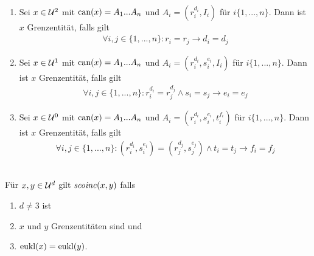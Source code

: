 \begin{dfn}[Grenzentität]\
    \begin{enumerate}
        \item Sei $x \in \mathcal{U}^2$ mit $\text{can}(x) = A_1 ... A_n$ und $A_i = (r_i^{d_i},I_i)$ für $i \{1, ..., n\}$. Dann ist $x$ Grenzentität, falls gilt
            \begin{align*}
                \forall i,j \in \{1, ..., n\}: r_i = r_j \to d_i = d_j
            \end{align*}
        \item Sei $x \in \mathcal{U}^1$ mit $\text{can}(x) = A_1 ... A_n$ und $A_i = (r_i^{d_i},s_i^{e_i},I_i)$ für $i \{1, ..., n\}$. Dann ist $x$ Grenzentität, falls gilt
            \begin{align*}
                \forall i,j \in \{1, ..., n\}: r_i^{d_i} = r_j^{d_j} \land s_i = s_j \to e_i = e_j
            \end{align*}
        \item Sei $x \in \mathcal{U}^0$ mit $\text{can}(x) = A_1 ... A_n$ und $A_i = (r_i^{d_i},s_i^{e_i},t_i^{f_i})$ für $i \{1, ..., n\}$. Dann ist $x$ Grenzentität, falls gilt
            \begin{align*}
                \forall i,j \in \{1, ..., n\}: (r_i^{d_i}, s_i^{e_i}) = (r_j^{d_j},s_j^{e_j}) \land t_i = t_j \to f_i = f_j
            \end{align*}
    \end{enumerate}
\end{dfn}


\begin{dfn}[$\Gscoinc$]\ \\
    Für $x,y \in \mathcal{U}^d$ gilt $\mathit{scoinc}(x,y)$ falls
    \begin{enumerate}
        \item $d \neq 3$ ist
        \item $x$ und $y$ Grenzentitäten sind und
        \item $\text{eukl}(x) = \text{eukl}(y)$.
    \end{enumerate}
\end{dfn}


